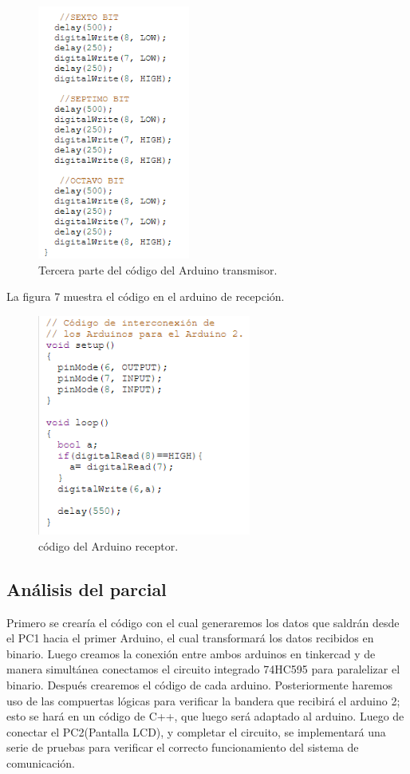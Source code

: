 \documentclass{article}
\begin{document}
\newpage

\begin{figure}[h]
\includegraphics[width=5cm]{codigo_arduino1_3.PNG}
\centering
\caption{Tercera parte del código del Arduino transmisor.}
\label{fig:codigo_arduino1_3.PNG}
\end{figure}


La figura 7 muestra el código en el arduino de recepción.\\

\newpage


\begin{figure}[h]
\includegraphics[width=7cm]{codigo_arduino2.PNG}
\centering
\caption{código del Arduino receptor.}
\label{fig:codigo_arduino2.PNG}
\end{figure}

\subsection{Análisis del parcial}
	
	Primero se crearía el código con el cual generaremos los datos que saldrán desde el PC1 hacia el primer Arduino, el cual transformará los datos recibidos en binario. 
Luego creamos la conexión entre ambos arduinos en tinkercad y de manera simultánea conectamos el circuito integrado 74HC595 para paralelizar el binario.
Después crearemos el código de cada arduino. 
Posteriormente haremos uso de las compuertas lógicas para verificar la bandera que recibirá el arduino 2; esto se hará en un código de C++, que luego será adaptado al arduino.
Luego de conectar el PC2(Pantalla LCD), y completar el circuito, se implementará una serie de pruebas para verificar el correcto funcionamiento del sistema de comunicación. 
\end{document}
